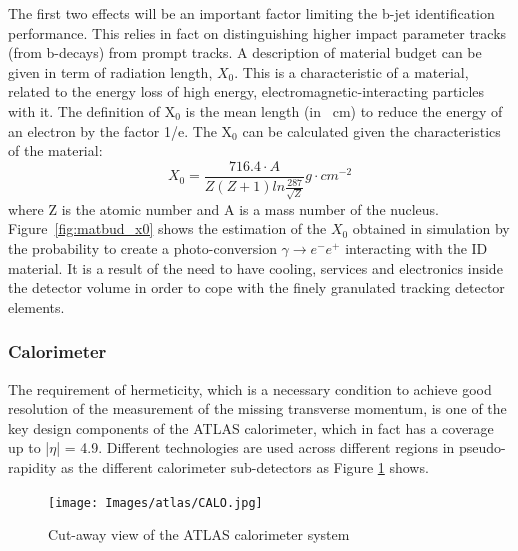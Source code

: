 The first two effects will be an important factor limiting the b-jet identification performance. This relies in fact on distinguishing higher impact parameter tracks (from b-decays) from prompt tracks.
A description of material budget can be given in term of radiation length, $X_0$. This is a characteristic of a material, related to the energy loss of high energy, electromagnetic-interacting particles with it. The definition of X$_0$ is the mean length (in \SI{}{\centi\meter}) to reduce the energy of an electron by the factor 1/e. The X$_0$ can be calculated given the characteristics of the material:
\begin{equation}
X_0=\frac{716.4 \cdot A}{Z(Z+1)ln{\frac{287}{\sqrt{Z}}}}g\cdot cm^{-2}
\end{equation}
where Z is the atomic number and A is a mass number of the nucleus.
Figure~\ref{fig:matbud_x0} shows the estimation of the $X_0$ obtained in simulation by the probability to create a photo-conversion $\gamma\rightarrow e^- e^+$ interacting with the ID material. It is a result of the need to have cooling, services and electronics inside the detector volume in order to cope with the finely granulated tracking detector elements. 

\subsubsection{Calorimeter}

The requirement of hermeticity, which is a necessary condition to achieve good resolution of the measurement of the missing transverse momentum, is one of the key design components of the ATLAS calorimeter, which in fact has a coverage up to |$\eta$| = 4.9. Different technologies are used across different regions in pseudo-rapidity as the different calorimeter sub-detectors as Figure \ref{pic:calo} shows.

\begin{figure}
\texttt{[image: Images/atlas/CALO.jpg]}
\caption{Cut-away view of the ATLAS calorimeter system}
\label{pic:calo}
\end{figure}

